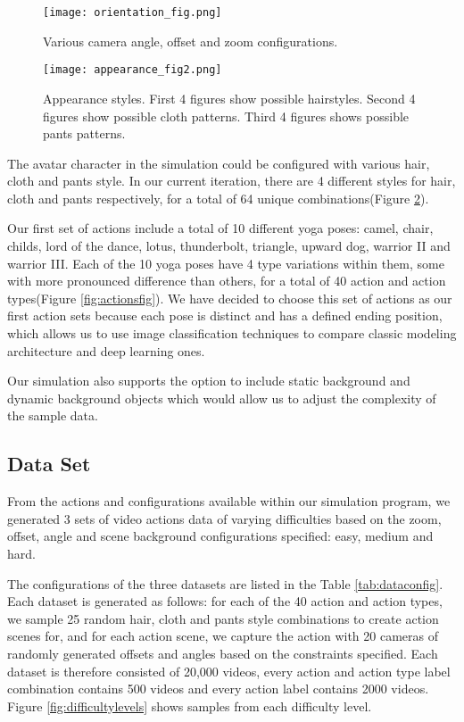 \documentclass[
	a4paper, %
	10pt, %
	unnumberedsections, %
	twoside, %
]{t0004}
\begin{document}
\begin{figure}
	\texttt{[image: orientation\_fig.png]}
	\caption{Various camera angle, offset and zoom configurations.}
	\label{fig:orientationfig}
\end{figure}

\begin{figure}
	\texttt{[image: appearance\_fig2.png]}
	\caption{Appearance styles. First 4 figures show possible hairstyles. Second 4 figures show possible cloth patterns. Third 4 figures shows possible pants patterns.}
	\label{fig:appearancefig}
\end{figure}

The avatar character in the simulation could be configured with various hair, cloth and pants style. In our current iteration, there are 4 different styles for hair, cloth and pants respectively, for a total of 64 unique combinations(Figure \ref{fig:appearancefig}).

Our first set of actions include a total of 10 different yoga poses: camel, chair, childs, lord of the dance, lotus, thunderbolt, triangle, upward dog, warrior II and warrior III. Each of the 10 yoga poses have 4 type variations within them, some with more pronounced difference than others,  for a total of 40 action and action types(Figure \ref{fig:actionsfig}). We have decided to choose this set of actions as our first action sets because each pose is distinct and has a defined ending position, which allows us to use image classification techniques to compare classic modeling architecture and deep learning ones.

Our simulation also supports the option to include static background and dynamic background objects which would allow us to adjust the complexity of the sample data.

\subsection{Data Set} From the actions and configurations available within our simulation program, we generated 3 sets of video actions data of varying difficulties based on the zoom, offset, angle and scene background configurations specified: easy, medium and hard.

The configurations of the three datasets are listed in the Table \ref{tab:dataconfig}. Each dataset is generated as follows: for each of the 40 action and action types, we sample 25 random hair, cloth and pants style combinations to create action scenes for, and for each action scene, we capture the action with 20 cameras of randomly generated offsets and angles based on the constraints specified. Each dataset is therefore consisted of 20,000 videos, every action and action type label combination contains 500 videos and every action label contains 2000 videos. Figure \ref{fig:difficultylevels} shows samples from each difficulty level.
\end{document}
